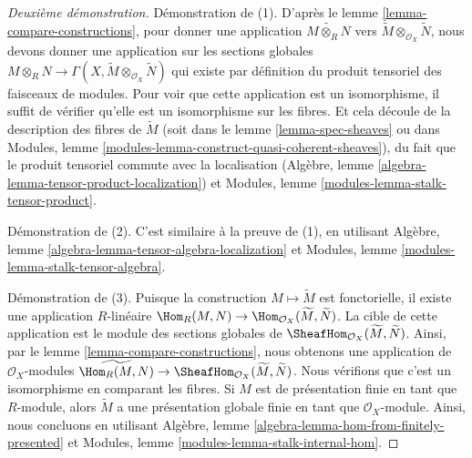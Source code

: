 \begin{proof}[Deuxième démonstration]
Démonstration de (1). D'après le lemme \ref{lemma-compare-constructions}, pour
donner une application $\widetilde{M
\otimes_R N}$ vers $\widetilde M \otimes_{\mathcal{O}_X}
\widetilde N$, nous devons donner une
application sur les sections
globales $M \otimes_R N \to \Gamma(X, \widetilde M \otimes_{\mathcal{O}_X}
\widetilde N)$ qui existe par définition du produit
tensoriel des faisceaux de modules. Pour voir que cette
application est un isomorphisme, il suffit de vérifier qu'elle est
un isomorphisme sur les fibres. Et cela découle de la
description des fibres de $\widetilde{M}$ (soit dans le lemme \ref{lemma-spec-sheaves}
ou dans Modules, lemme \ref{modules-lemma-construct-quasi-coherent-sheaves}),
du fait que le produit tensoriel commute avec la
localisation (Algèbre, lemme \ref{algebra-lemma-tensor-product-localization})
et Modules, lemme \ref{modules-lemma-stalk-tensor-product}.

\medskip\noindent
Démonstration de (2). C'est similaire à la preuve de (1), en
utilisant Algèbre, lemme \ref{algebra-lemma-tensor-algebra-localization}
et Modules, lemme \ref{modules-lemma-stalk-tensor-algebra}.

\medskip\noindent
Démonstration de (3). Puisque la construction $M \mapsto \widetilde{M}$ est fonctorielle,
il existe une application
$R$-linéaire $\Hom_R(M, N) \to \Hom_{\mathcal{O}_X}(\widetilde{M}, \widetilde{N})$.
La cible de cette application est le module des sections
globales de $\SheafHom_{\mathcal{O}_X}(\widetilde M, \widetilde
N)$. Ainsi, par le lemme \ref{lemma-compare-constructions}, nous
obtenons une application de $\mathcal{O}_X$-modules $\widetilde{\Hom_R(M,
N)} \to \SheafHom_{\mathcal{O}_X}(\widetilde M, \widetilde
N)$. Nous vérifions que c'est un isomorphisme en comparant les
fibres. Si $M$ est de présentation finie en tant que
$R$-module, alors $\widetilde M$ a une présentation globale finie
en tant que $\mathcal{O}_X$-module. Ainsi, nous concluons
en utilisant Algèbre, lemme \ref{algebra-lemma-hom-from-finitely-presented}
et Modules, lemme \ref{modules-lemma-stalk-internal-hom}.
\end{proof}

